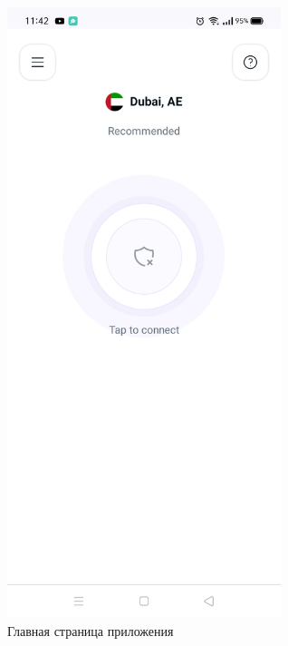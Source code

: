 \begin{itemize}
\begin{figure}[H]
\includegraphics[width=8cm]{35.png}
\centering
\caption{Главная страница приложения}
\label{fig:47}
\end{figure}
\end{itemize}

